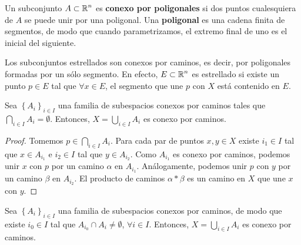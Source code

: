 \begin{definition}
Un subconjunto $\displaystyle A \subset \mathbb{R}^{n} $ es \textbf{conexo por poligonales} si dos puntos cualesquiera de $\displaystyle A $ se puede unir por una poligonal. Una \textbf{poligonal} es una cadena finita de segmentos, de modo que cuando parametrizamos, el extremo final de uno es el inicial del siguiente. 
\end{definition}
\begin{eg}
Los subconjuntos estrellados son conexos por caminos, es decir, por poligonales formadas por un sólo segmento. En efecto, $\displaystyle E \subset \mathbb{R}^{n} $ es estrellado si existe un punto $\displaystyle p \in E $ tal que $\displaystyle \forall x \in E $, el segmento que une $\displaystyle p $ con $\displaystyle X $ está contenido en $\displaystyle E $.
\end{eg}
\begin{theorem}
	Sea $\displaystyle \left\{ A_{i}\right\} _{i \in I} $ una familia de subespacios conexos por caminos tales que $\displaystyle \bigcap_{i \in I}A_{i}= \emptyset $. Entonces, $\displaystyle X = \bigcup_{i \in I}A_{i} $ es conexo por caminos.
\end{theorem}
\begin{proof}
Tomemos $\displaystyle p \in \bigcap_{i \in I}A_{i} $. Para cada par de puntos $\displaystyle x,y \in X $ existe $\displaystyle i_{1}\in I $ tal que $\displaystyle x \in A_{i_{1}} $ e $\displaystyle i_{2}\in I $ tal que $\displaystyle y \in A_{i_{2}} $. 
Como $\displaystyle A_{i_{1}} $ es conexo por caminos, podemos unir $\displaystyle x $ con $\displaystyle p $ por un camino $\displaystyle \alpha  $ en $\displaystyle A_{i_{1}} $. Análogamente, podemos unir $\displaystyle p $ con $\displaystyle y $ por un camino $\displaystyle \beta  $ en $\displaystyle A_{i_{2}} $. El producto de caminos $\displaystyle \alpha * \beta  $ es un camino en $\displaystyle X $ que une $\displaystyle x $ con $\displaystyle y $.
\end{proof}
\begin{prop}
	Sea $\displaystyle \left\{ A_{i}\right\} _{i \in I} $ una familia de subespacios conexos por caminos, de modo que existe $\displaystyle i_{0}\in I $ tal que $\displaystyle A_{i_{0}}\cap A_{i}\neq \emptyset $, $\displaystyle \forall i \in I $. Entonces, $\displaystyle X = \bigcup_{i \in I}A_{i} $ es conexo por caminos.
\end{prop}
